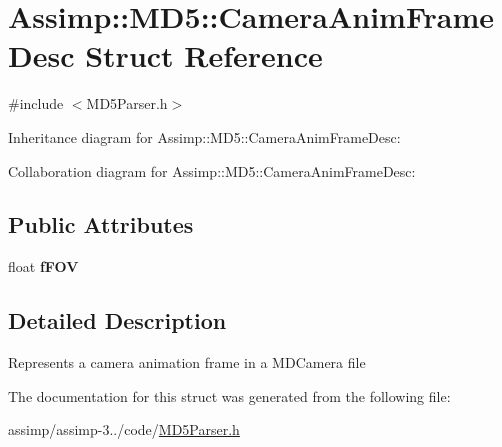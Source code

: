\hypertarget{struct_assimp_1_1_m_d5_1_1_camera_anim_frame_desc}{\section{Assimp\+:\+:M\+D5\+:\+:Camera\+Anim\+Frame\+Desc Struct Reference}
\label{struct_assimp_1_1_m_d5_1_1_camera_anim_frame_desc}
}


{\ttfamily \#include $<$M\+D5\+Parser.\+h$>$}



Inheritance diagram for Assimp\+:\+:M\+D5\+:\+:Camera\+Anim\+Frame\+Desc\+:


Collaboration diagram for Assimp\+:\+:M\+D5\+:\+:Camera\+Anim\+Frame\+Desc\+:
\subsection*{Public Attributes}
\begin{DoxyCompactItemize}
\item 
\hypertarget{struct_assimp_1_1_m_d5_1_1_camera_anim_frame_desc_ae0fe0de6d89232be7f57919fd3d15e5b}{float {\bfseries f\+F\+O\+V}}\label{struct_assimp_1_1_m_d5_1_1_camera_anim_frame_desc_ae0fe0de6d89232be7f57919fd3d15e5b}

\end{DoxyCompactItemize}


\subsection{Detailed Description}
Represents a camera animation frame in a M\+D\+Camera file 

The documentation for this struct was generated from the following file\+:\begin{DoxyCompactItemize}
\item 
assimp/assimp-\/3../code/\hyperlink{_m_d5_parser_8h}{M\+D5\+Parser.\+h}\end{DoxyCompactItemize}
